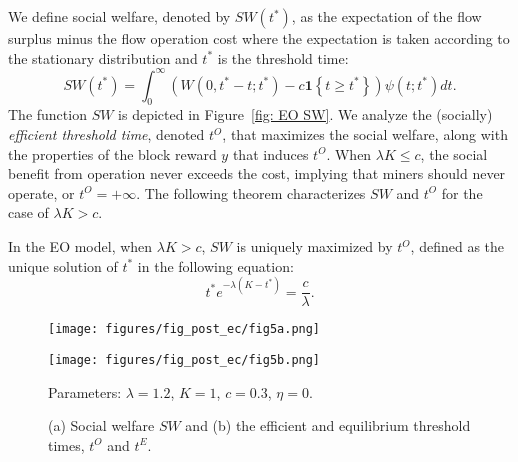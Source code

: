 \documentclass[12pt, letterpaper]{article}
\begin{document}
We define social welfare, denoted by $SW(t^*)$, as the expectation of the flow surplus minus the flow operation cost where the expectation is taken according to the stationary distribution and $t^*$ is the threshold time:
\begin{equation}
    SW(t^*) =  \int_0^\infty (W(0, t^* - t; t^*) - c \textbf{1}\left\{t \ge t^*\right\}) \psi(t; t^*) dt.
\end{equation}
The function $SW$ is depicted in Figure~\ref{fig: EO SW}. We analyze the (socially) \emph{efficient threshold time}, denoted $t^O$, that maximizes the social welfare, along with the properties of the block reward $y$ that induces $t^O$. When $\lambda K \le c$, the social benefit from operation never exceeds the cost, implying that miners should never operate, or $t^O = + \infty$. The following theorem characterizes $SW$ and $t^O$ for the case of $\lambda K > c$.

\begin{prop}\label{prop: bar SW and tO}
    In the EO model, when $\lambda K > c$, $SW$ is uniquely maximized by $t^O$, defined as the unique solution of $t^*$ in the following equation:
    \begin{equation}\label{eq: efficient t star}
        t^* e^{-\lambda (K - t^*)} = \frac{c}{\lambda}.
    \end{equation}
\end{prop}

\begin{figure}[tb]
    \centering
    \begin{minipage}[b]{0.475\textwidth}
        \centering
        \texttt{[image: figures/fig\_post\_ec/fig5a.png]}
        \label{fig: EO SW}
    \end{minipage}
    \hfill
    \begin{minipage}[b]{0.475\textwidth}  
        \centering 
        \texttt{[image: figures/fig\_post\_ec/fig5b.png]}
        \label{fig: EO tO determination}
    \end{minipage}
    \caption{(a) Social welfare $SW$ and (b) the efficient and equilibrium threshold times, $t^O$ and $t^E$.}
    \label{fig: social welfare and tO}
    \begin{center}\footnotesize
        Parameters: $\lambda = 1.2$, $K = 1$, $c = 0.3$, $\eta = 0$.
    \end{center}
\end{figure}
\end{document}

